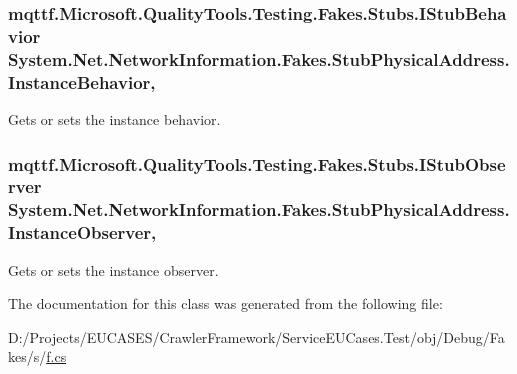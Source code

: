 \hypertarget{class_system_1_1_net_1_1_network_information_1_1_fakes_1_1_stub_physical_address_aebb8307e9ab056c3b80cbc5e2327793b}{
\subsubsection[{Instance\-Behavior}]{\setlength{\rightskip}{0pt plus 5cm}mqttf.\-Microsoft.\-Quality\-Tools.\-Testing.\-Fakes.\-Stubs.\-I\-Stub\-Behavior System.\-Net.\-Network\-Information.\-Fakes.\-Stub\-Physical\-Address.\-Instance\-Behavior\hspace{0.3cm}{\ttfamily [get]}, {\ttfamily [set]}}}\label{class_system_1_1_net_1_1_network_information_1_1_fakes_1_1_stub_physical_address_aebb8307e9ab056c3b80cbc5e2327793b}


Gets or sets the instance behavior.

\hypertarget{class_system_1_1_net_1_1_network_information_1_1_fakes_1_1_stub_physical_address_a38fbfc57caa91894dae185282fb54d28}{
\subsubsection[{Instance\-Observer}]{\setlength{\rightskip}{0pt plus 5cm}mqttf.\-Microsoft.\-Quality\-Tools.\-Testing.\-Fakes.\-Stubs.\-I\-Stub\-Observer System.\-Net.\-Network\-Information.\-Fakes.\-Stub\-Physical\-Address.\-Instance\-Observer\hspace{0.3cm}{\ttfamily [get]}, {\ttfamily [set]}}}\label{class_system_1_1_net_1_1_network_information_1_1_fakes_1_1_stub_physical_address_a38fbfc57caa91894dae185282fb54d28}


Gets or sets the instance observer.



The documentation for this class was generated from the following file\-:\begin{DoxyCompactItemize}
\item 
D\-:/\-Projects/\-E\-U\-C\-A\-S\-E\-S/\-Crawler\-Framework/\-Service\-E\-U\-Cases.\-Test/obj/\-Debug/\-Fakes/s/\hyperlink{s_2f_8cs}{f.\-cs}\end{DoxyCompactItemize}
